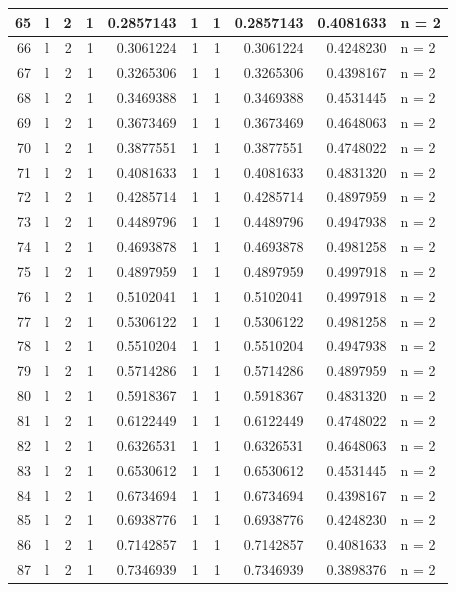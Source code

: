 \documentclass[
  letterpaper,
  DIV=11,
  numbers=noendperiod]{scrreprt}
\begin{document}
\begin{table}
\begin{tabular}[t]{r|l|r|r|r|r|r|r|r|l}
\hline
65 & l & 2 & 1 & 0.2857143 & 1 & 1 & 0.2857143 & 0.4081633 & n = 2\\
\hline
66 & l & 2 & 1 & 0.3061224 & 1 & 1 & 0.3061224 & 0.4248230 & n = 2\\
\hline
67 & l & 2 & 1 & 0.3265306 & 1 & 1 & 0.3265306 & 0.4398167 & n = 2\\
\hline
68 & l & 2 & 1 & 0.3469388 & 1 & 1 & 0.3469388 & 0.4531445 & n = 2\\
\hline
69 & l & 2 & 1 & 0.3673469 & 1 & 1 & 0.3673469 & 0.4648063 & n = 2\\
\hline
70 & l & 2 & 1 & 0.3877551 & 1 & 1 & 0.3877551 & 0.4748022 & n = 2\\
\hline
71 & l & 2 & 1 & 0.4081633 & 1 & 1 & 0.4081633 & 0.4831320 & n = 2\\
\hline
72 & l & 2 & 1 & 0.4285714 & 1 & 1 & 0.4285714 & 0.4897959 & n = 2\\
\hline
73 & l & 2 & 1 & 0.4489796 & 1 & 1 & 0.4489796 & 0.4947938 & n = 2\\
\hline
74 & l & 2 & 1 & 0.4693878 & 1 & 1 & 0.4693878 & 0.4981258 & n = 2\\
\hline
75 & l & 2 & 1 & 0.4897959 & 1 & 1 & 0.4897959 & 0.4997918 & n = 2\\
\hline
76 & l & 2 & 1 & 0.5102041 & 1 & 1 & 0.5102041 & 0.4997918 & n = 2\\
\hline
77 & l & 2 & 1 & 0.5306122 & 1 & 1 & 0.5306122 & 0.4981258 & n = 2\\
\hline
78 & l & 2 & 1 & 0.5510204 & 1 & 1 & 0.5510204 & 0.4947938 & n = 2\\
\hline
79 & l & 2 & 1 & 0.5714286 & 1 & 1 & 0.5714286 & 0.4897959 & n = 2\\
\hline
80 & l & 2 & 1 & 0.5918367 & 1 & 1 & 0.5918367 & 0.4831320 & n = 2\\
\hline
81 & l & 2 & 1 & 0.6122449 & 1 & 1 & 0.6122449 & 0.4748022 & n = 2\\
\hline
82 & l & 2 & 1 & 0.6326531 & 1 & 1 & 0.6326531 & 0.4648063 & n = 2\\
\hline
83 & l & 2 & 1 & 0.6530612 & 1 & 1 & 0.6530612 & 0.4531445 & n = 2\\
\hline
84 & l & 2 & 1 & 0.6734694 & 1 & 1 & 0.6734694 & 0.4398167 & n = 2\\
\hline
85 & l & 2 & 1 & 0.6938776 & 1 & 1 & 0.6938776 & 0.4248230 & n = 2\\
\hline
86 & l & 2 & 1 & 0.7142857 & 1 & 1 & 0.7142857 & 0.4081633 & n = 2\\
\hline
87 & l & 2 & 1 & 0.7346939 & 1 & 1 & 0.7346939 & 0.3898376 & n = 2\\

\end{tabular}
\end{table}
\end{document}
